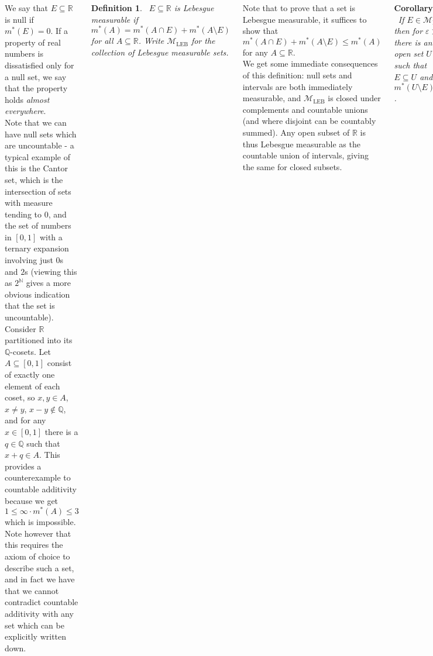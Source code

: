 \documentclass{tikzposter} %
\newtheorem{corollary}{Corollary}
\newtheorem{definition}{Definition}
\begin{document}
\begin{columns}
{{    We say that $E \subseteq \mathbb{R}$ is null if $m^{*}(E) = 0$. If a property of real numbers is dissatisfied only for a null set, we say that the property holds \emph{almost everywhere}. \\

    Note that we can have null sets which are uncountable - a typical example of this is the Cantor set, which is the intersection of sets with measure tending to $0$, and the set of numbers in $[0,1]$ with a ternary expansion involving just $0$s and $2$s (viewing this as $2^{\mathbb{N}}$ gives a more obvious indication that the set is uncountable). \\

    Consider $\mathbb{R}$ partitioned into its $\mathbb{Q}$-cosets. Let $A \subseteq [0,1]$ consist of exactly one element of each coset, so $x, y \in A$, $x \neq y$, $x-y \notin \mathbb{Q}$, and for any $x \in [0,1]$ there is a $q \in \mathbb{Q}$ such that $x + q \in A$. This provides a counterexample to countable additivity because we get $1 \le \infty \cdot m^{*}(A) \le 3$ which is impossible. Note however that this requires the axiom of choice to describe such a set, and in fact we have that we cannot contradict countable additivity with any set which can be explicitly written down. \\

    \begin{definition}
      \ $E \subseteq \mathbb{R}$ is Lebesgue measurable if
      \[
        m^{*}(A) = m^{*}(A \cap E) + m^{*}(A \setminus E)
      \]
      for all $A \subseteq \mathbb{R}$. Write $\mathcal{M}_{\mathrm{LEB}}$ for the collection of Lebesgue measurable sets.
    \end{definition}
    \hphantom{}

    Note that to prove that a set is Lebesgue measurable, it suffices to show that $m^{*}(A \cap E) + m^{*}(A \setminus E) \leq m^{*}(A)$ for any $A \subseteq \mathbb{R}$. \\

    We get some immediate consequences of this definition: null sets and intervals are both immediately measurable, and $\mathcal{M}_{\mathrm{LEB}}$ is closed under complements and countable unions (and where disjoint can be countably summed). Any open subset of $\mathbb{R}$ is thus Lebesgue measurable as the countable union of intervals, giving the same for closed subsets.\\

    \begin{corollary}
    \ If $E \in \mathcal{M}_{\mathrm{LEB}}$ then for $\varepsilon > 0$, there is an open set $U \subseteq \mathbb{R}$ such that $E \subseteq U$ and $m^{*}(U \setminus E) < \varepsilon$.
    \end{corollary}
    \hphantom{}

}}
\end{columns}
\end{document}
